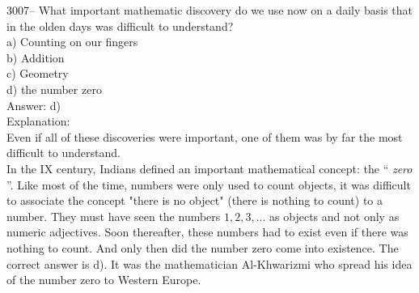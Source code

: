 \documentclass[letterpaper, 12pt]{article}
\begin{document}
3007-- What important mathematic discovery do we use now on a daily basis that in the olden days was difficult to understand?\\

a) Counting on our fingers\\
b) Addition\\
c) Geometry\\
d) the number zero\\

Answer: d)\\

Explanation:\\
Even if all of these discoveries were important, one of them was by far the most difficult to understand.\\
In the IX century, Indians defined an important mathematical concept: the `` \emph{zero} ''. Like most of the time, numbers were only used to count objects, it was difficult to associate the concept "there is no object" (there is nothing to count) to a number.  They must have seen the numbers $1, 2, 3, ...$ as objects and not only as numeric adjectives. Soon thereafter, these numbers had to exist even if there was nothing to count. And only then did  the number zero come into existence. The correct answer is d). It was the mathematician Al-Khwarizmi who spread his idea of the number zero to Western Europe.\\
\end{document}
